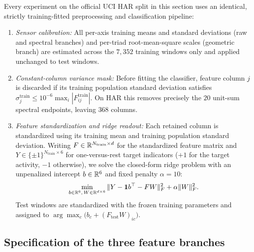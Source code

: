Every experiment on the official UCI HAR split in this section uses an identical,
strictly training-fitted preprocessing and classification pipeline:
\begin{enumerate}
\item \emph{Sensor calibration:} All per-axis training means and standard
deviations (raw and spectral branches) and per-triad root-mean-square scales
(geometric branch) are estimated across the \(7{,}352\) training windows only
and applied unchanged to test windows.
\item \emph{Constant-column variance mask:} Before fitting the classifier,
feature column \(j\) is discarded if its training population standard deviation
satisfies \(\sigma^{\mathrm{train}}_j \leq 10^{-6}\max_i |F^{\mathrm{train}}_{ij}|\).
On HAR this removes precisely the \(20\) unit-sum spectral endpoints, leaving
\(368\) columns.
\item \emph{Feature standardization and ridge readout:} Each retained column is
standardized using its training mean and training population standard deviation.
Writing \(F \in \mathbb{R}^{N_{\mathrm{train}} \times d}\) for the standardized feature
matrix and \(Y \in \{\pm 1\}^{N_{\mathrm{train}} \times 6}\) for one-versus-rest
target indicators (\(+1\) for the target activity, \(-1\) otherwise), we solve
the closed-form ridge problem with an unpenalized intercept \(b \in \mathbb{R}^6\) and
fixed penalty \(\alpha = 10\):
\begin{equation}\label{eq:har-ridge}
 \min_{b \in \mathbb{R}^6,\, W \in \mathbb{R}^{d \times 6}}
 \|Y - \mathbf 1 b^\top - F W\|_F^2 + \alpha \|W\|_F^2.
\end{equation}
Test windows are standardized with the frozen training parameters and assigned
to \(\arg\max_{c} \bigl(b_c + (F_{\mathrm{test}} W)_{ic}\bigr)\).
\end{enumerate}

\subsection{Specification of the three feature branches}

